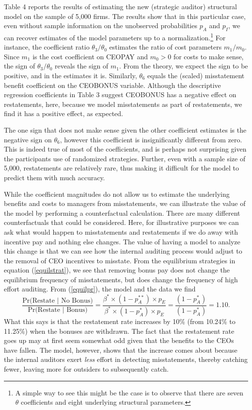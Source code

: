 Table 4 reports the results of estimating the new (strategic auditor) structural model on 
the sample of 5,000 firms. The results show that in this particular case, even without sample information on the unobserved probabilities $p_A$ and 
$p_I$, we can recover estimates of the model parameters up to a normalization.\footnote{A simple way to
see this might be the case is to observe that there are seven $\theta$ coefficients and eight underlying structural parameters.}
For instance, the coefficient ratio $\theta_3/\theta_0$ estimates the ratio of cost parameters $m_1/m_0$. Since $m_1$ is the cost coefficient on CEOPAY and $m_0>0$
for costs to make sense, the sign of $\theta_3/\theta_0$ reveals the sign of $m_1$.
From the theory, we expect the sign to be positive, and in the estimates it is. Similarly,
$\theta_6$ equals the (scaled) misstatement benefit coefficient on the CEOBONUS variable.
Although the descriptive regression coefficients in Table 3 suggest CEOBONUS has a
negative effect on restatements, here, because we model misstatements as part of
restatements, we find it has a positive effect, as expected.

The one sign that
does not make sense given the other coefficient estimates is the negative sign on $\theta_6$,
however this coefficient is insignificantly different from zero. This is indeed true of most of
the coefficients, and is perhaps not surprising given the participants use of randomized strategies.
Further, even with a sample size of 5,000, restatements are relatively rare, thus making
it difficult for the model to predict them with much accuracy. 

While
the coefficient magnitudes do not allow us to estimate the underlying benefits and costs to managers from
misstatements, we can illustrate the value of the model by performing a counterfactual calculation.
There are many different counterfactuals that could be considered. Here, for illustrative purposes
we can ask what would happen to misstatements and restatements if we 
do away with incentive pay and nothing else changes. The value of having a model to analyze this
change is that we can see how the internal auditing process would adjust to the removal of 
CEO incentives to misstate. 
From the equilibrium strategies in equation (\ref{equilstrat}), we see that removing bonus pay does not
change the equilibrium frequency of misstatements, but does change the frequency of high effort auditing.
From (\ref{equilpr}), the model and the data we find
$$ \dfrac{\mbox{Pr(Restate }\vert \mbox{ No Bonus)}}{\mbox{Pr(Restate }\vert \mbox{ Bonus)}}=\dfrac{\beta^* \times (1-p_A^{**}) \times p_{E}}
{\beta^* \times (1-p_A^{*}) \times p_{E}} = \dfrac{(1-p_A^*)}{(1-p_A^*)} = 1.10.$$
What this says is that the restatement rate increases by 10\% (from 10.24\% to 11.25\%) when the bonuses
are withdrawn. The fact that the restatement rate goes up may at first seem somewhat odd
given that the benefits to the CEOs have fallen. The model, however, shows that the increase 
comes about because the internal auditors exert {\it less} effort in detecting
misstatements, thereby catching fewer, leaving more for outsiders to subsequently catch.  

